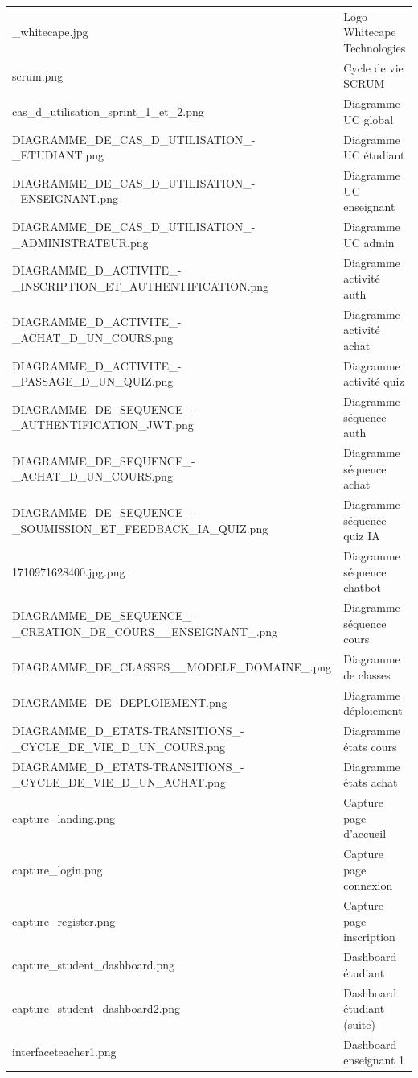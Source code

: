 \begin{table}[H]
\begin{tabularx}{\textwidth}{>{\ttfamily}l X}
\_whitecape.jpg & Logo Whitecape Technologies \\
scrum.png & Cycle de vie SCRUM \\
cas\_d\_utilisation\_sprint\_1\_et\_2.png & Diagramme UC global \\
DIAGRAMME\_DE\_CAS\_D\_UTILISATION\_-\_ETUDIANT.png & Diagramme UC étudiant \\
DIAGRAMME\_DE\_CAS\_D\_UTILISATION\_-\_ENSEIGNANT.png & Diagramme UC enseignant \\
DIAGRAMME\_DE\_CAS\_D\_UTILISATION\_-\_ADMINISTRATEUR.png & Diagramme UC admin \\
DIAGRAMME\_D\_ACTIVITE\_-\_INSCRIPTION\_ET\_AUTHENTIFICATION.png & Diagramme activité auth \\
DIAGRAMME\_D\_ACTIVITE\_-\_ACHAT\_D\_UN\_COURS.png & Diagramme activité achat \\
DIAGRAMME\_D\_ACTIVITE\_-\_PASSAGE\_D\_UN\_QUIZ.png & Diagramme activité quiz \\
DIAGRAMME\_DE\_SEQUENCE\_-\_AUTHENTIFICATION\_JWT.png & Diagramme séquence auth \\
DIAGRAMME\_DE\_SEQUENCE\_-\_ACHAT\_D\_UN\_COURS.png & Diagramme séquence achat \\
DIAGRAMME\_DE\_SEQUENCE\_-\_SOUMISSION\_ET\_FEEDBACK\_IA\_QUIZ.png & Diagramme séquence quiz IA \\
1710971628400.jpg.png & Diagramme séquence chatbot \\
DIAGRAMME\_DE\_SEQUENCE\_-\_CREATION\_DE\_COURS\_\_ENSEIGNANT\_.png & Diagramme séquence cours \\
DIAGRAMME\_DE\_CLASSES\_\_MODELE\_DOMAINE\_.png & Diagramme de classes \\
DIAGRAMME\_DE\_DEPLOIEMENT.png & Diagramme déploiement \\
DIAGRAMME\_D\_ETATS-TRANSITIONS\_-\_CYCLE\_DE\_VIE\_D\_UN\_COURS.png & Diagramme états cours \\
DIAGRAMME\_D\_ETATS-TRANSITIONS\_-\_CYCLE\_DE\_VIE\_D\_UN\_ACHAT.png & Diagramme états achat \\
capture\_landing.png & Capture page d'accueil \\
capture\_login.png & Capture page connexion \\
capture\_register.png & Capture page inscription \\
capture\_student\_dashboard.png & Dashboard étudiant \\
capture\_student\_dashboard2.png & Dashboard étudiant (suite) \\
interfaceteacher1.png & Dashboard enseignant 1 \\

\end{tabularx}
\end{table}
